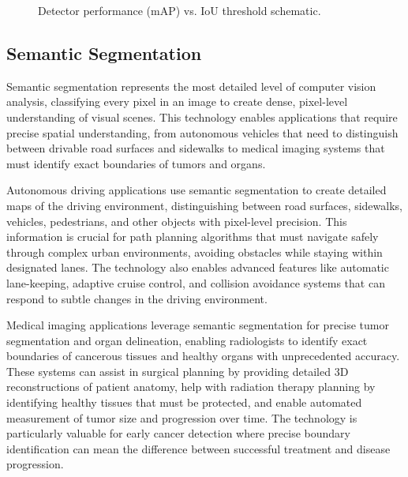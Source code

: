 \begin{figure}[h]
  \centering
  \caption{Detector performance (mAP) vs. IoU threshold schematic.}
  \label{fig:map-iou}
\end{figure}

\subsection{Semantic Segmentation}

Semantic segmentation represents the most detailed level of computer vision analysis, classifying every pixel in an image to create dense, pixel-level understanding of visual scenes. This technology enables applications that require precise spatial understanding, from autonomous vehicles that need to distinguish between drivable road surfaces and sidewalks to medical imaging systems that must identify exact boundaries of tumors and organs.

Autonomous driving applications use semantic segmentation to create detailed maps of the driving environment, distinguishing between road surfaces, sidewalks, vehicles, pedestrians, and other objects with pixel-level precision. This information is crucial for path planning algorithms that must navigate safely through complex urban environments, avoiding obstacles while staying within designated lanes. The technology also enables advanced features like automatic lane-keeping, adaptive cruise control, and collision avoidance systems that can respond to subtle changes in the driving environment.

Medical imaging applications leverage semantic segmentation for precise tumor segmentation and organ delineation, enabling radiologists to identify exact boundaries of cancerous tissues and healthy organs with unprecedented accuracy. These systems can assist in surgical planning by providing detailed 3D reconstructions of patient anatomy, help with radiation therapy planning by identifying healthy tissues that must be protected, and enable automated measurement of tumor size and progression over time. The technology is particularly valuable for early cancer detection where precise boundary identification can mean the difference between successful treatment and disease progression.

